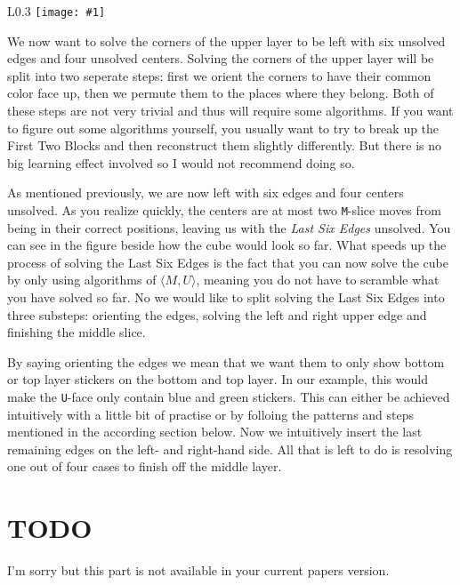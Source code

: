 \documentclass{scrreprt}
\newcommand{\wrapfig}[5] {
	\begin{wrapfigure}{#2}{#3\textwidth}
	\centering
	\texttt{[image: \#1]}
	\caption*{#5}
	\end{wrapfigure}
}
\begin{document}
\wrapfig{lse.png}{L}{0.3}{0.3}{Before the Last Six Edges}

We now want to solve the corners of the upper layer to be left with six unsolved edges and four unsolved centers. Solving the corners of the upper layer will be split into two seperate steps: first we orient the corners to have their common color face up, then we permute them to the places where they belong. Both of these steps are not very trivial and thus will require some algorithms. If you want to figure out some algorithms yourself, you usually want to try to break up the First Two Blocks and then reconstruct them slightly differently. But there is no big learning effect involved so I would not recommend doing so.\par

As mentioned previously, we are now left with six edges and four centers unsolved. As you realize quickly, the centers are at most two \texttt{M}-slice moves from being in their correct positions, leaving us with the \emph{Last Six Edges} unsolved. You can see in the figure beside how the cube would look so far. What speeds up the process of solving the Last Six Edges is the fact that you can now solve the cube by only using algorithms of $\langle M, U\rangle$, meaning you do not have to scramble what you have solved so far. No we would like to split solving the Last Six Edges into three substeps: orienting the edges, solving the left and right upper edge and finishing the middle slice.\par

By saying orienting the edges we mean that we want them to only show bottom or top layer stickers on the bottom and top layer. In our example, this would make the \texttt{U}-face only contain blue and green stickers. This can either be achieved intuitively with a little bit of practise or by folloing the patterns and steps mentioned in the according section below. Now we intuitively insert the last remaining edges on the left- and right-hand side. All that is left to do is resolving one out of four cases to finish off the middle layer.

\chapter{TODO}
I'm sorry but this part is not available in your current papers version.
\end{document}
